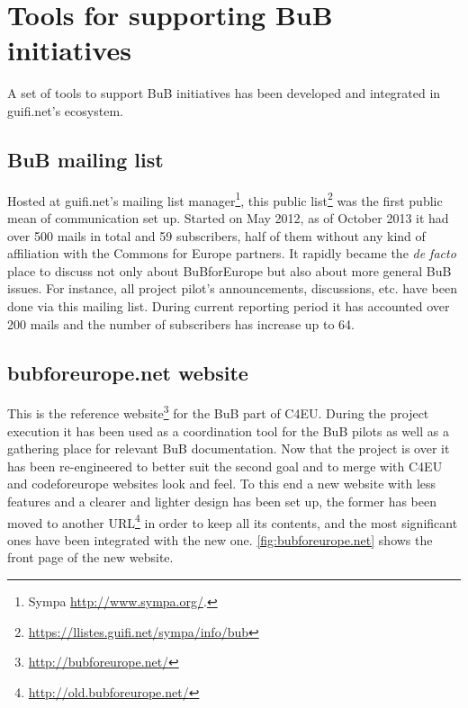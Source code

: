 \clearpage
\section{Tools for supporting BuB initiatives}
\label{sec:tools}

A set of tools to support BuB initiatives has been developed and integrated in guifi.net's ecosystem.

\subsection{BuB mailing list}

Hosted at guifi.net's mailing list manager\footnote{Sympa \url{http://www.sympa.org/}.}, this public list\footnote{\url{https://llistes.guifi.net/sympa/info/bub}} was the first public mean of communication set up. Started on May 2012, as of October 2013 it had over 500 mails in total and 59 subscribers, half of them without any kind of affiliation with the Commons for Europe partners. It rapidly became the \emph{de facto} place to discuss not only about BuBforEurope but also about more general BuB issues. For instance, all project pilot's announcements, discussions, etc. have been done via this mailing list. During current reporting period it has accounted over 200 mails and the number of subscribers has increase up to 64.


\subsection{bubforeurope.net website}

This is the reference website\footnote{\url{http://bubforeurope.net/}} for the BuB part of C4EU. During the project execution it has been used as a coordination tool for the BuB pilots as well as a gathering place for relevant BuB documentation. Now that the project is over it has been re-engineered to better suit the second goal and to merge with C4EU and codeforeurope websites look and feel. To this end a new website with less features and a clearer and lighter design has been set up, the former has been moved to another URL\footnote{\url{http://old.bubforeurope.net/}} in order to keep all its contents, and the most significant ones have been integrated with the new one. \figurename \ref{fig:bubforeurope.net} shows the front page of the new website.

